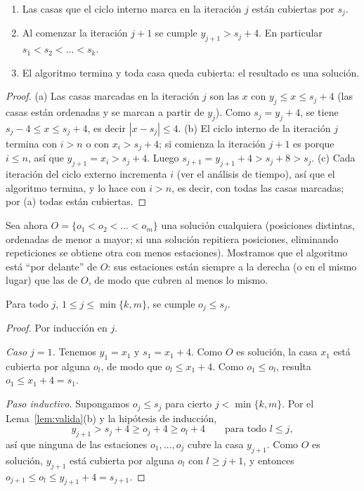 \begin{lema}\label{lem:valida}
\begin{enumerate}[label=(\alph*)]
  \item Las casas que el ciclo interno marca en la iteración $j$ están cubiertas por $s_j$.
  \item Al comenzar la iteración $j+1$ se cumple $y_{j+1}>s_j+4$. En particular
        $s_1<s_2<\dots<s_k$.
  \item El algoritmo termina y toda casa queda cubierta: el resultado es una solución.
\end{enumerate}
\end{lema}
\begin{proof}
(a) Las casas marcadas en la iteración $j$ son las $x$ con $y_j\le x\le s_j+4$ (las casas están
ordenadas y se marcan a partir de $y_j$). Como $s_j=y_j+4$, se tiene $s_j-4\le x\le s_j+4$, es
decir $|x-s_j|\le 4$.
(b) El ciclo interno de la iteración $j$ termina con $i>n$ o con $x_i>s_j+4$; si comienza la
iteración $j+1$ es porque $i\le n$, así que $y_{j+1}=x_i>s_j+4$. Luego
$s_{j+1}=y_{j+1}+4>s_j+8>s_j$.
(c) Cada iteración del ciclo externo incrementa $i$ (ver el análisis de tiempo), así que el
algoritmo termina, y lo hace con $i>n$, es decir, con todas las casas marcadas; por (a) todas
están cubiertas.
\end{proof}

Sea ahora $O=\{o_1<o_2<\dots<o_m\}$ una solución cualquiera (posiciones distintas, ordenadas de
menor a mayor; si una solución repitiera posiciones, eliminando repeticiones se obtiene otra con
menos estaciones). Mostramos que el algoritmo está ``por delante'' de $O$: sus estaciones están
siempre a la derecha (o en el mismo lugar) que las de $O$, de modo que cubren al menos lo mismo.

\begin{proposicion}\label{prop:adelante}
Para todo $j$, $1\le j\le\min\{k,m\}$, se cumple $o_j\le s_j$.
\end{proposicion}
\begin{proof}
Por inducción en $j$.

\emph{Caso $j=1$.} Tenemos $y_1=x_1$ y $s_1=x_1+4$. Como $O$ es solución, la casa $x_1$ está
cubierta por alguna $o_l$, de modo que $o_l\le x_1+4$. Como $o_1\le o_l$, resulta
$o_1\le x_1+4=s_1$.

\emph{Paso inductivo.} Supongamos $o_j\le s_j$ para cierto $j<\min\{k,m\}$. Por el
Lema~\ref{lem:valida}(b) y la hipótesis de inducción,
\[
y_{j+1}>s_j+4\ge o_j+4\ge o_l+4\qquad\text{para todo } l\le j,
\]
así que ninguna de las estaciones $o_1,\dots,o_j$ cubre la casa $y_{j+1}$. Como $O$ es
solución, $y_{j+1}$ está cubierta por alguna $o_l$ con $l\ge j+1$, y entonces
$o_{j+1}\le o_l\le y_{j+1}+4=s_{j+1}$.
\end{proof}

